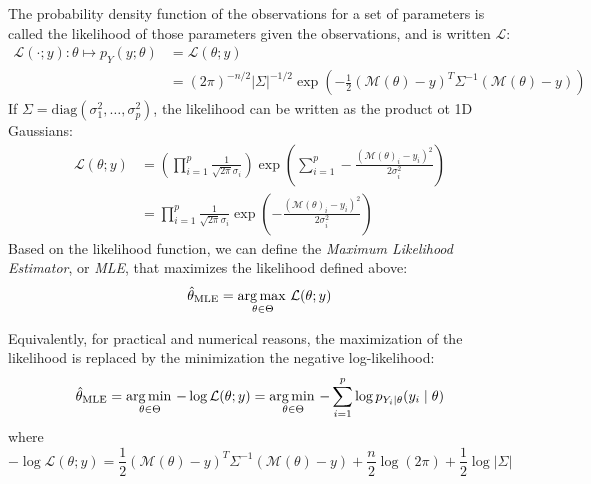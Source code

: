 \documentclass[../../Main_ManuscritThese.tex]{subfiles}
\begin{document}
\begin{definition}
  \label{def:mle}
  The probability density function of the observations for a set of parameters is called the likelihood of those parameters given the observations, and is written $\mathcal{L}$:
  \begin{align}
    \label{eq:likelihood_definition}
    \mathcal{L}(\cdot ;y): \theta \mapsto p_{Y}(y;\theta) &= \mathcal{L}(\theta;y) \\
    &=(2\pi)^{-n/2}\lvert \Sigma \rvert^{-1/2}\exp\left(-\frac{1}{2}(\mathcal{M}(\theta) - y)^T\Sigma^{-1}(\mathcal{M}(\theta) - y)\right)
  \end{align}
  If $\Sigma = \mathrm{diag}(\sigma^2_1,\dots, \sigma^2_p)$, the likelihood can be written as the product ot 1D Gaussians:
  \begin{align}
    \mathcal{L}(\theta;y) &= \left(\prod_{i=1}^p\frac{1}{\sqrt{2\pi}\sigma_i}\right)\exp\left(\sum_{i=1}^p -\frac{(\mathcal{M}(\theta)_i - y_i)^2}{2\sigma^2_i}\right) \\
                          &= \prod_{i=1}^p\frac{1}{\sqrt{2\pi}\sigma_i}\exp\left(-\frac{(\mathcal{M}(\theta)_i - y_i)^2}{2\sigma^2_i}\right)
  \end{align}
  Based on the likelihood function, we can define the \emph{Maximum Likelihood Estimator}, or \emph{MLE}, that maximizes the likelihood defined above:
  \begin{equation}
    \label{eq:def_MLE}
    \hat{\theta}_{\mathrm{MLE}} = \operatorname*{arg\,max \,}_{\theta\in\Theta}\mathcal{L}(\theta;y)
  \end{equation}

\end{definition}
  Equivalently, for practical and numerical reasons, the maximization of the likelihood is replaced by the minimization the negative log-likelihood:
  \begin{equation}
    \label{eq:MLE_iid}
    \hat{\theta}_{\mathrm{MLE}} = \operatorname*{arg\,min \,}_{\theta \in \Theta} -\log \mathcal{L}(\theta;y)= \operatorname*{arg\,min \,}_{\theta \in \Theta} -\sum_{i=1}^p\log p_{Y_i\mid \theta}(y_i \mid \theta) 
  \end{equation} 
  where
  \begin{equation}
    -\log\mathcal{L}(\theta;y) = \frac{1}{2}(\mathcal{M}(\theta) - y)^T\Sigma^{-1}(\mathcal{M}(\theta) - y)+  \frac{n}{2}\log(2\pi) + \frac{1}{2}\log\lvert \Sigma \rvert
  \end{equation}
\end{document}

